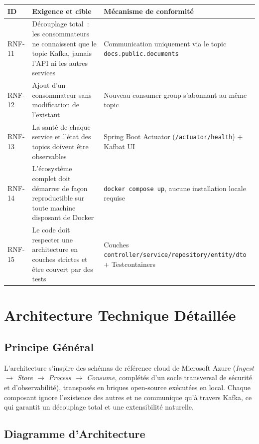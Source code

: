 \documentclass[12pt,a4paper,openany]{report}
\begin{document}
    \begin{longtable}{p{1.4cm}p{6.7cm}p{4cm}}
      \toprule
      \textbf{ID} & \textbf{Exigence et cible} & \textbf{M\'ecanisme de conformit\'e} \\
      \midrule
      \endhead
      \bottomrule
      \endfoot

      RNF-11 & D\'ecouplage total~: les consommateurs ne connaissent que le topic Kafka, jamais l'API ni les autres services & Communication uniquement via le topic \texttt{docs.public.documents} \\[4pt]
      RNF-12 & Ajout d'un consommateur sans modification de l'existant & Nouveau consumer group s'abonnant au m\^eme topic \\[4pt]
      RNF-13 & La sant\'e de chaque service et l'\'etat des topics doivent \^etre observables & Spring Boot Actuator (\texttt{/actuator/health}) + Kafbat UI \\[4pt]
      RNF-14 & L'\'ecosyst\`eme complet doit d\'emarrer de fa\c{c}on reproductible sur toute machine disposant de Docker & \texttt{docker compose up}, aucune installation locale requise \\[4pt]
      RNF-15 & Le code doit respecter une architecture en couches strictes et \^etre couvert par des tests & Couches \texttt{controller/service/repository/entity/dto} + Testcontainers \\
    \end{longtable}

    \chapter{Architecture Technique D\'etaill\'ee}
    \label{chap:archi}

    \section{Principe G\'en\'eral}

    L'architecture s'inspire des sch\'emas de r\'ef\'erence cloud de Microsoft Azure (\emph{Ingest $\rightarrow$ Store $\rightarrow$ Process $\rightarrow$ Consume}, compl\'et\'es d'un socle transversal de s\'ecurit\'e et d'observabilit\'e), transpos\'es en briques open-source ex\'ecut\'ees en local. Chaque composant ignore l'existence des autres et ne communique qu'\`a travers Kafka, ce qui garantit un d\'ecouplage total et une extensibilit\'e naturelle.

    \section{Diagramme d'Architecture}
\end{document}
